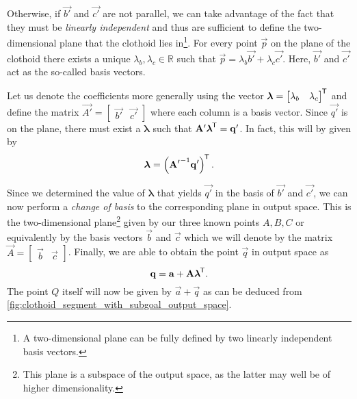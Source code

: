 Otherwise, if $\vec{b'}$ and $\vec{c'}$ are not parallel, we can take advantage of the fact that they must be \textit{linearly independent} and thus are sufficient to define the two-dimensional plane that the clothoid lies in\footnote{A two-dimensional plane can be fully defined by two linearly independent basis vectors.}.
For every point $\vec{p}$ on the plane of the clothoid there exists a unique $\lambda_b,\lambda_c \in \mathbb{R}$ such that $\vec{p} = \lambda_b \vec{b'} + \lambda_c \vec{c'}$. 
Here, $\vec{b'}$ and $\vec{c'}$ act as the so-called basis vectors.

Let us denote the coefficients more generally using the vector
$\boldsymbol{\lambda} = \begin{bmatrix}
    \lambda_b & \lambda_c
\end{bmatrix}^{\mkern-1.5mu\mathsf{T}}$
and define the matrix
$\vec{A'} = \begin{bmatrix}
    \vec{b'} & \vec{c'}
\end{bmatrix}$
where each column is a basis vector.
Since $\vec{q'}$ is on the plane, there must exist a $\boldsymbol{\lambda}$ such that
$\mathbf{A'} \boldsymbol{\lambda}^{\mkern-1.5mu\mathsf{T}} = \mathbf{q'}$.
In fact, this will by given by
\begin{equation}
    \label{eq:vec_transformation_qprime_to_lambda}
    \boldsymbol{\lambda} = \left(\mathbf{A'}^{-1} \mathbf{q'}\right)^{\mkern-1.5mu\mathsf{T}}.
\end{equation}

Since we determined the value of $\boldsymbol{\lambda}$ that yields $\vec{q'}$ in the basis of $\vec{b'}$ and $\vec{c'}$, 
we can now perform a \textit{change of basis} to the corresponding plane in output space.
This is the two-dimensional plane\footnote{This plane is a subspace of the output space, as the latter may well be of higher dimensionality.} given by our three known points $A,B,C$ or equivalently by the basis vectors $\vec{b}$ and $\vec{c}$ which we will denote by the matrix
$\vec{A} = \begin{bmatrix}
    \vec{b} & \vec{c}
\end{bmatrix}$.
Finally, we are able to obtain the point $\vec{q}$ in output space as
\begin{equation}
    \label{eq:vec_transformation_lambda_to_q}
    \mathbf{q} = \mathbf{a} + \mathbf{A} \boldsymbol{\lambda}^{\mkern-1.5mu\mathsf{T}}.
\end{equation}
The point $Q$ itself will now be given by $\vec{a}+\vec{q}$ as can be deduced from \ref{fig:clothoid_segment_with_subgoal_output_space}.

